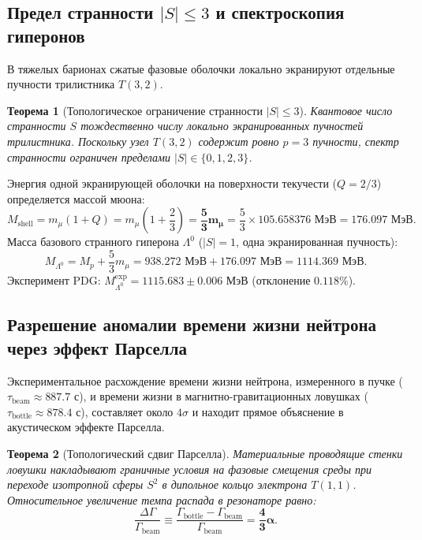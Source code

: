 \documentclass[11pt,a4paper]{article}
\newtheorem{theorem}{Теорема}[section]
\theoremstyle{definition}
\theoremstyle{remark}
\begin{document}
\subsection{Предел странности $|S| \le 3$ и спектроскопия гиперонов}
В тяжелых барионах сжатые фазовые оболочки локально экранируют отдельные пучности трилистника $T(3,2)$.

\begin{theorem}[Топологическое ограничение странности $|S| \le 3$]
Квантовое число странности $S$ тождественно числу локально экранированных пучностей трилистника. Поскольку узел $T(3,2)$ содержит ровно $p=3$ пучности, спектр странности ограничен пределами $|S| \in \{0, 1, 2, 3\}$.
\end{theorem}

Энергия одной экранирующей оболочки на поверхности текучести ($Q = 2/3$) определяется массой мюона:
\begin{equation}
    M_{\mathrm{shell}} = m_\mu (1 + Q) = m_\mu \left( 1 + \frac{2}{3} \right) = \boldsymbol{\frac{5}{3} m_\mu} = \frac{5}{3} \times 105.658376\text{ МэВ} = \mathbf{176.097\text{ МэВ}}.
    \label{eq:strangeness_shell}
\end{equation}
Масса базового странного гиперона $\Lambda^0$ ($|S|=1$, одна экранированная пучность):
\begin{equation}
    M_{\Lambda^0} = M_p + \frac{5}{3} m_\mu = 938.272\text{ МэВ} + 176.097\text{ МэВ} = \mathbf{1114.369\text{ МэВ}}.
\end{equation}
Эксперимент PDG: $M_{\Lambda^0}^{\mathrm{exp}} = 1115.683 \pm 0.006$ МэВ (отклонение $0.118\%$).

\subsection{Разрешение аномалии времени жизни нейтрона через эффект Парселла}
Экспериментальное расхождение времени жизни нейтрона, измеренного в пучке ($\tau_{\mathrm{beam}} \approx 887.7$ с), и времени жизни в магнитно-гравитационных ловушках ($\tau_{\mathrm{bottle}} \approx 878.4$ с), составляет около $4\sigma$ и находит прямое объяснение в акустическом эффекте Парселла.

\begin{theorem}[Топологический сдвиг Парселла]
Материальные проводящие стенки ловушки накладывают граничные условия на фазовые смещения среды при переходе изотропной сферы $S^2$ в дипольное кольцо электрона $T(1,1)$. Относительное увеличение темпа распада в резонаторе равно:
\begin{equation}
    \frac{\Delta \Gamma}{\Gamma_{\mathrm{beam}}} \equiv \frac{\Gamma_{\mathrm{bottle}} - \Gamma_{\mathrm{beam}}}{\Gamma_{\mathrm{beam}}} = \boldsymbol{\frac{4}{3}\alpha}.
    \label{eq:purcell_shift}
\end{equation}
\end{theorem}
\end{document}

